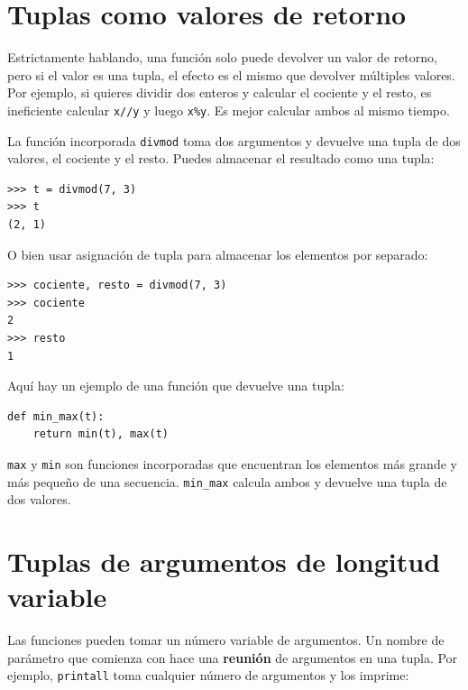\documentclass[10pt]{book}
\begin{document}
\section{Tuplas como valores de retorno}

Estrictamente hablando, una función solo puede devolver un valor de retorno, pero
si el valor es una tupla, el efecto es el mismo que devolver
múltiples valores.  Por ejemplo, si quieres dividir dos enteros
y calcular el cociente y el resto, es ineficiente
calcular {\tt x//y} y luego {\tt x\%y}.  Es mejor calcular
ambos al mismo tiempo.

La función incorporada {\tt divmod} toma dos argumentos y
devuelve una tupla de dos valores, el cociente y el resto.
Puedes almacenar el resultado como una tupla:

\begin{verbatim}
>>> t = divmod(7, 3)
>>> t
(2, 1)
\end{verbatim}
%
O bien usar asignación de tupla para almacenar los elementos por separado:

\begin{verbatim}
>>> cociente, resto = divmod(7, 3)
>>> cociente
2
>>> resto
1
\end{verbatim}
%
Aquí hay un ejemplo de una función que devuelve una tupla:

\begin{verbatim}
def min_max(t):
    return min(t), max(t)
\end{verbatim}
%
{\tt max} y {\tt min} son funciones incorporadas que encuentran
los elementos más grande y más pequeño de una secuencia.  \verb"min_max"
calcula ambos y devuelve una tupla de dos valores.


\section{Tuplas de argumentos de longitud variable}
\label{gather}

Las funciones pueden tomar un número variable de argumentos.  Un nombre de parámetro
que comienza con {\tt *} hace una {\bf reunión} de argumentos en
una tupla.  Por ejemplo, {\tt printall}
toma cualquier número de argumentos y los imprime:
\end{document}
